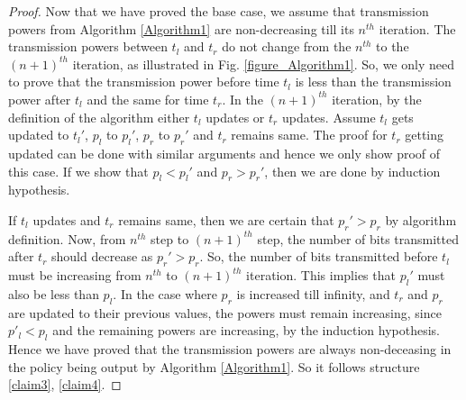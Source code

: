 \begin{proof}
Now that we have proved the base case, we assume that transmission powers from Algorithm \ref{Algorithm1} are non-decreasing till its $n^{th}$ iteration. The transmission powers between $t_l$ and $t_r$ do not change from the $n^{th}$ to the $(n+1)^{th}$ iteration, as illustrated in Fig. \ref{figure_Algorithm1}. So, we only need to prove that the transmission power before time $t_l$ is less than the transmission power after $t_l$ and the same for time $t_r$. In the $(n+1)^{th}$ iteration, by the definition of the algorithm either $t_l$ updates or $t_{r}$ updates. Assume $t_l$ gets updated to $t_{l}'$, $p_l$ to $p_l'$, $p_r$ to $p_r'$ and $t_r$ remains same. The proof for $t_r$ getting updated can be done with similar arguments and hence we only show proof of this case. If we show that $p_l<p_l'$ and $p_r>p_r'$, then we are done by induction hypothesis.

If $t_l$ updates and $t_r$ remains same, then we are certain that $p_{r}'>p_r$ by algorithm definition. Now, from $n^{th}$ step to $(n+1)^{th}$ step, the number of bits transmitted after $t_r$ should decrease as $p_{r}'>p_r$. So, the number of bits transmitted before $t_l$ must be increasing from $n^{th}$ to $(n+1)^{th}$ iteration. This implies that $p_l'$ must also be less than $p_l$. In the case where $p_r$ is increased till infinity, and $t_r$ and $p_r$ are updated to their previous values, the powers must remain increasing, since $p'_l <p_l$ and the remaining powers are increasing, by the induction hypothesis. Hence we have proved that the transmission powers are always non-deceasing in the policy being output by Algorithm \ref{Algorithm1}. So it follows structure \eqref{claim3}, \eqref{claim4}.



\end{proof}
